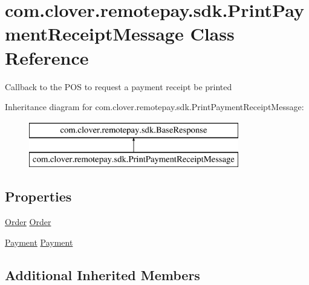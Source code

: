 \hypertarget{classcom_1_1clover_1_1remotepay_1_1sdk_1_1_print_payment_receipt_message}{}\section{com.\+clover.\+remotepay.\+sdk.\+Print\+Payment\+Receipt\+Message Class Reference}
\label{classcom_1_1clover_1_1remotepay_1_1sdk_1_1_print_payment_receipt_message}


Callback to the P\+OS to request a payment receipt be printed  


Inheritance diagram for com.\+clover.\+remotepay.\+sdk.\+Print\+Payment\+Receipt\+Message\+:\begin{figure}[H]
\begin{center}
\leavevmode
\includegraphics[height=2.000000cm]{classcom_1_1clover_1_1remotepay_1_1sdk_1_1_print_payment_receipt_message}
\end{center}
\end{figure}
\subsection*{Properties}
\begin{DoxyCompactItemize}
\item 
\hyperlink{classcom_1_1clover_1_1sdk_1_1v3_1_1order_1_1_order}{Order} \hyperlink{classcom_1_1clover_1_1remotepay_1_1sdk_1_1_print_payment_receipt_message_ac8a030a3cf9e33eced012fe0664b1271}{Order}
\item 
\hyperlink{classcom_1_1clover_1_1sdk_1_1v3_1_1payments_1_1_payment}{Payment} \hyperlink{classcom_1_1clover_1_1remotepay_1_1sdk_1_1_print_payment_receipt_message_a199fbecfd435a443be49fa6c069f209a}{Payment}
\end{DoxyCompactItemize}
\subsection*{Additional Inherited Members}


